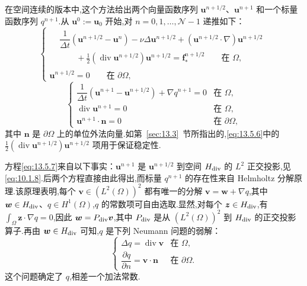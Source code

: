 在空间连续的版本中,这个方法给出两个向量函数序列 \(\boldsymbol{u}^{n+1/2}\)、\(\boldsymbol{u}^{n+1}\) 和一个标量函数序列 \(q^{n+1}\).从 \(\boldsymbol{u}^0:=\boldsymbol{u}_0\) 开始,对 \(n=0,1,\ldots,\mathcal N-1\) 递推如下：
\begin{equation}\label{eq:13.5.6}
  \begin{cases}
    \begin{aligned}
      &\dfrac1{\Delta t}(\boldsymbol{u}^{n+1/2}-\boldsymbol{u}^n)
         -\nu\Delta\boldsymbol{u}^{n+1/2}
         +(\boldsymbol{u}^{n+1/2}\cdot\nabla)\boldsymbol{u}^{n+1/2}\\
      &\qquad+\tfrac12(\operatorname{div}\boldsymbol{u}^{n+1/2})\boldsymbol{u}^{n+1/2}
          =\boldsymbol{f}_*^{n+1/2} \qquad\text{在 }\Omega,
    \end{aligned}\\[2pt]
    \boldsymbol{u}^{n+1/2}=0 \qquad\text{在 }\partial\Omega,
  \end{cases}
\end{equation}
\begin{equation}\label{eq:13.5.7}
  \begin{cases}
    \dfrac1{\Delta t}(\boldsymbol{u}^{n+1}-\boldsymbol{u}^{n+1/2})+\nabla q^{n+1}=0
      & \text{在 }\Omega,\\[2pt]
    \operatorname{div}\boldsymbol{u}^{n+1}=0 & \text{在 }\Omega,\\
    \boldsymbol{u}^{n+1}\cdot\boldsymbol{n}=0 & \text{在 }\partial\Omega,
  \end{cases}
\end{equation}
其中 \(\boldsymbol{n}\) 是 \(\partial\Omega\) 上的单位外法向量.如第~\ref{sec:13.3}~节所指出的,\eqref{eq:13.5.6}中的 \(\tfrac12(\operatorname{div}\boldsymbol{u}^{n+1/2})\boldsymbol{u}^{n+1/2}\) 项用于保证稳定性.

方程\eqref{eq:13.5.7}来自以下事实：\(\boldsymbol{u}^{n+1}\) 是 \(\boldsymbol{u}^{n+1/2}\) 到空间 \(H_{\rm div}\) 的 \(L^2\) 正交投影,见\eqref{eq:10.1.8}.后两个方程直接由此得出,而标量 \(q^{n+1}\) 的存在性来自 Helmholtz 分解原理.该原理表明,每个 \(\boldsymbol{v}\in(L^2(\Omega))^2\) 都有唯一的分解 \(\boldsymbol{v}=\boldsymbol{w}+\nabla q\),其中 \(\boldsymbol{w}\in H_{\rm div}\)、\(q\in H^1(\Omega)\),\(q\) 的常数项可自由选取.显然,对每个 \(\boldsymbol{z}\in H_{\rm div}\),有 \(\int_\Omega\boldsymbol{z}\cdot\nabla q=0\),因此 \(\boldsymbol{w}=P_{\rm div}\boldsymbol{v}\),其中 \(P_{\rm div}\) 是从 \((L^2(\Omega))^2\) 到 \(H_{\rm div}\) 的正交投影算子.再由 \(\boldsymbol{w}\in H_{\rm div}\) 可知,\(q\) 是下列 Neumann 问题的弱解：
\[
  \begin{cases}
    \Delta q=\operatorname{div}\boldsymbol{v} & \text{在 }\Omega,\\[2pt]
    \dfrac{\partial q}{\partial n}=\boldsymbol{v}\cdot\boldsymbol{n}
      & \text{在 }\partial\Omega.
  \end{cases}
\]
这个问题确定了 \(q\),相差一个加法常数.

